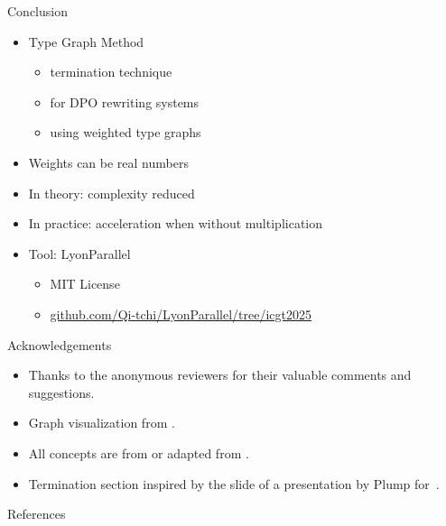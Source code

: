 \documentclass{beamer}
\begin{document}
\begin{frame}{Conclusion}
  \begin{itemize}
    \item Type Graph Method 
         \begin{itemize}
          \item termination technique
          \item for DPO rewriting systems
          \item using weighted type graphs 
         \end{itemize}
    \item Weights can be real numbers
    \item In theory: complexity reduced
    \item In practice: acceleration when without multiplication
    \item Tool: LyonParallel
        \begin{itemize}
          \item MIT License
          \item \url{github.com/Qi-tchi/LyonParallel/tree/icgt2025}
        \end{itemize}
  \end{itemize}
\end{frame} 

\begin{frame}{Acknowledgements}
  \begin{itemize}
    \item Thanks to the anonymous reviewers for their valuable comments and suggestions.
    \item Graph visualization from \cite{overbeek2023apbpotutorial}.
    \item All concepts are from or adapted from \cite{endrullis2024generalized_arxiv_v2}.
    \item Termination section inspired by the slide of a presentation by Plump for~\cite{plump2018modular}.
  \end{itemize}
\end{frame}

\begin{frame}[allowframebreaks]{References}
    \printbibliography[heading=none]
\end{frame}
\end{document}

